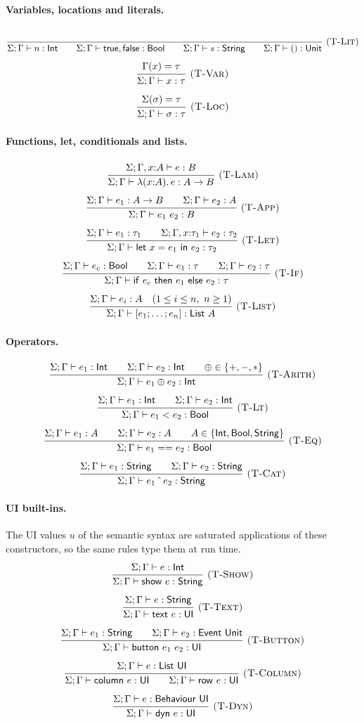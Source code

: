 \documentclass{article}
\makeatletter
\newcommand{\kw}[1]{\mathsf{#1}}
\newcommand{\rul}[3]{\[\dfrac{\begin{array}{@{}c@{}}#2\end{array}}{\begin{array}{@{}c@{}}#3\end{array}}\ \textsc{#1}\]}
\newcommand{\tj}{\Sigma;\Gamma \vdash}   %
\makeatother
\begin{document}
\paragraph{Variables, locations and literals.}
\rul{(T-Lit)}{\ }{\tj n : \kw{Int} \qquad \tj \kw{true},\kw{false} : \kw{Bool} \qquad \tj s : \kw{String} \qquad \tj () : \kw{Unit}}
\rul{(T-Var)}{\Gamma(x) = \tau}{\tj x : \tau}
\rul{(T-Loc)}{\Sigma(\sigma) = \tau}{\tj \sigma : \tau}

\paragraph{Functions, let, conditionals and lists.}
\rul{(T-Lam)}{\Sigma;\Gamma, x{:}A \vdash e : B}{\tj \lambda(x{:}A).\,e : A \to B}
\rul{(T-App)}{\tj e_1 : A \to B \qquad \tj e_2 : A}{\tj e_1\ e_2 : B}
\rul{(T-Let)}{\tj e_1 : \tau_1 \qquad \Sigma;\Gamma, x{:}\tau_1 \vdash e_2 : \tau_2}{\tj \kw{let}\ x = e_1\ \kw{in}\ e_2 : \tau_2}
\rul{(T-If)}{\tj e_c : \kw{Bool} \qquad \tj e_1 : \tau \qquad \tj e_2 : \tau}
{\tj \kw{if}\ e_c\ \kw{then}\ e_1\ \kw{else}\ e_2 : \tau}
\rul{(T-List)}{\tj e_i : A \quad (1 \le i \le n,\ n \ge 1)}{\tj [e_1;\dots;e_n] : \kw{List}\ A}

\paragraph{Operators.}
\rul{(T-Arith)}{\tj e_1 : \kw{Int} \qquad \tj e_2 : \kw{Int} \qquad \oplus \in \{+,-,*\}}{\tj e_1 \oplus e_2 : \kw{Int}}
\rul{(T-Lt)}{\tj e_1 : \kw{Int} \qquad \tj e_2 : \kw{Int}}{\tj e_1 < e_2 : \kw{Bool}}
\rul{(T-Eq)}{\tj e_1 : A \qquad \tj e_2 : A \qquad A \in \{\kw{Int},\kw{Bool},\kw{String}\}}{\tj e_1 == e_2 : \kw{Bool}}
\rul{(T-Cat)}{\tj e_1 : \kw{String} \qquad \tj e_2 : \kw{String}}{\tj e_1 \mathbin{\hat{\ }} e_2 : \kw{String}}

\paragraph{UI built-ins.} The UI values $u$ of the semantic syntax are saturated applications of these
constructors, so the same rules type them at run time.
\rul{(T-Show)}{\tj e : \kw{Int}}{\tj \kw{show}\ e : \kw{String}}
\rul{(T-Text)}{\tj e : \kw{String}}{\tj \kw{text}\ e : \kw{UI}}
\rul{(T-Button)}{\tj e_1 : \kw{String} \qquad \tj e_2 : \kw{Event}\ \kw{Unit}}{\tj \kw{button}\ e_1\ e_2 : \kw{UI}}
\rul{(T-Column)}{\tj e : \kw{List}\ \kw{UI}}{\tj \kw{column}\ e : \kw{UI} \qquad \tj \kw{row}\ e : \kw{UI}}
\rul{(T-Dyn)}{\tj e : \kw{Behaviour}\ \kw{UI}}{\tj \kw{dyn}\ e : \kw{UI}}
\end{document}
